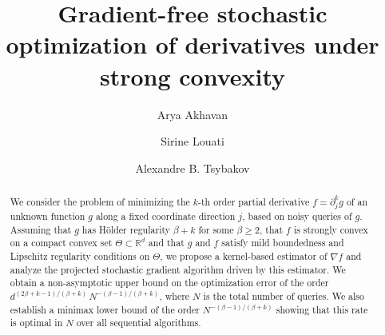 \documentclass{article}
\title{Gradient-free stochastic optimization of derivatives under strong convexity}
\author[1]{Arya Akhavan}
\author[2]{Sirine Louati}
\author[2]{Alexandre B. Tsybakov}
\affil[1]{University of Oxford}
\affil[2]{CREST, ENSAE, IP Paris}
\date{}
\renewcommand{\ge}{\geqslant}
\theoremstyle{definition}
\begin{document}
\maketitle

\begin{abstract}
We consider the problem of minimizing the $k$-th order partial 
derivative $f=\partial_j^k g$ of an unknown function $g$ along a 
fixed coordinate direction $j$, based on noisy  
queries of $g$. Assuming that $g$ has H\"older regularity
${\beta+k}$ for some $\beta\ge 2$, that $f$ is 
strongly convex on a compact convex set $\Theta\subset\mathbb{R}^d$ 
and that $g$ and $f$ satisfy mild boundedness and Lipschitz 
regularity conditions on $\Theta$, we propose a kernel-based 
estimator of $\nabla f$ and analyze the projected stochastic 
gradient algorithm driven by this estimator. We obtain a 
non-asymptotic upper bound on the optimization error of the order 
$d^{(2\beta+k-1)/(\beta+k)}\,N^{-(\beta-1)/(\beta+k)}$, where 
$N$ is the total number of queries. We also
establish a minimax lower bound of the order 
$N^{-(\beta-1)/(\beta+k)}$ showing that this rate is optimal 
in $N$ over all sequential algorithms. %
\end{abstract}
\end{document}
